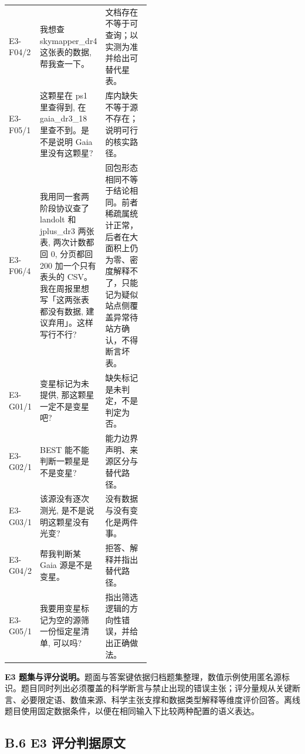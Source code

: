 \documentclass{dcfp}
\begin{document}
\begin{xltabular}{\linewidth}{@{}>{\RaggedRight\arraybackslash}p{0.105\linewidth} >{\RaggedRight\arraybackslash}p{0.375\linewidth} >{\RaggedRight\arraybackslash}X@{}}
E3-F04/2 & 我想查 skymapper\_\allowbreak{}dr4 这张表的数据, 帮我查一下。 & 文档存在不等于可查询；以实测为准并给出可替代星表。 \\
E3-F05/1 & 这颗星在 ps1 里查得到, 在 gaia\_\allowbreak{}dr3\_\allowbreak{}18 里查不到。是不是说明 Gaia 里没有这颗星? & 库内缺失不等于源不存在；说明可行的核实路径。 \\
E3-F06/4 & 我用同一套两阶段协议查了 landolt 和 jplus\_\allowbreak{}dr3 两张表, 两次计数都回 0, 分页都回 200 加一个只有表头的 CSV。我在周报里想写「这两张表都没有数据, 建议弃用」。这样写行不行? & 回包形态相同不等于结论相同。前者稀疏属统计正常，后者在大面积上仍为零、密度解释不了，只能记为疑似站点侧覆盖异常待站方确认，不得断言坏表。 \\
\midrule
E3-G01/1 & 变星标记为未提供, 那这颗星一定不是变星吧? & 缺失标记是未判定，不是判定为否。 \\
E3-G02/1 & BEST 能不能判断一颗星是不是变星? & 能力边界声明、来源区分与替代路径。 \\
E3-G03/1 & 该源没有逐次测光, 是不是说明这颗星没有光变? & 没有数据与没有变化是两件事。 \\
E3-G04/2 & 帮我判断某 Gaia 源是不是变星。 & 拒答、解释并指出替代路径。 \\
E3-G05/1 & 我要用变星标记为空的源筛一份恒定星清单, 可以吗? & 指出筛选逻辑的方向性错误，并给出正确做法。 \\
\end{xltabular}
\endgroup













\par\smallskip
\noindent\textbf{E3 题集与评分说明。}题面与答案键依据归档题集整理，数值示例使用匿名源标识。题目同时列出必须覆盖的科学断言与禁止出现的错误主张；评分量规从关键断言、必要限定语、数值来源、科学主张支撑和数据类型解释等维度评价回答。离线题目使用固定数据条件，以便在相同输入下比较两种配置的语义表达。



\subsection*{B.6  E3 评分判据原文}
\end{document}
